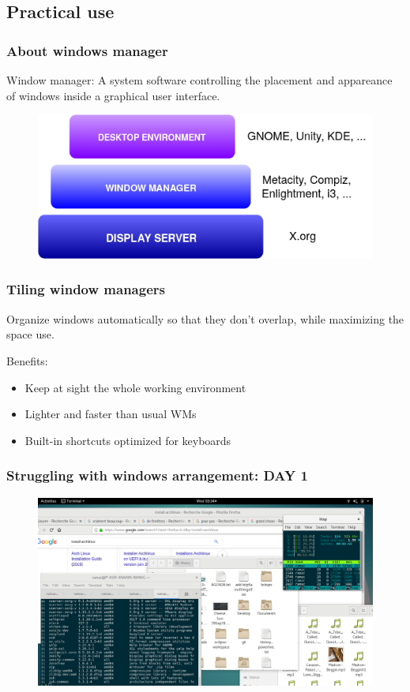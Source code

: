 \documentclass[aspectratio=169]{beamer}
\begin{document}
\subsection{Practical use}

\begin{frame}
    \frametitle{About windows manager}
  Window manager: A system software controlling the placement and appareance of windows inside a graphical user interface.\newline
    \begin{figure}[h]
        \includegraphics[scale=0.5]{./images/windows_stack.png}
    \end{figure}
\end{frame}

\begin{frame}
    \frametitle{Tiling window managers}
    Organize windows automatically so that they don’t overlap, while maximizing the space use.\newline

    Benefits:
    \begin{itemize}
      \item Keep at sight the whole working environment
      \item Lighter and faster than usual WMs
      \item Built-in shortcuts optimized for keyboards
    \end{itemize}
\end{frame}

\begin{frame}
    \frametitle{Struggling with windows arrangement: DAY 1}
    \begin{figure}[h]
        \includegraphics[scale=0.23]{./images/messy_wp.png}
    \end{figure}
\end{frame}
\end{document}
